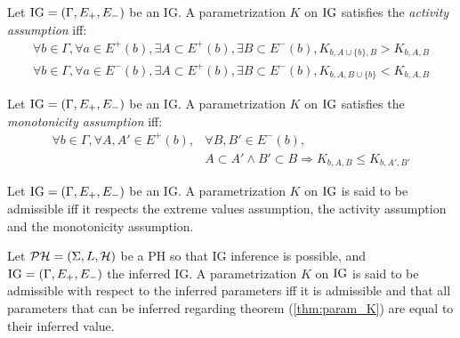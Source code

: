 \begin{property}
\label{prop:param_enum_activity}
Let $\mathrm{IG} = (\Gamma, E_+, E_-)$ be an IG. A parametrization $K$ on $\mathrm{IG}$ satisfies the \emph{activity assumption} iff:
\begin{align*}
  \forall b \in \Gamma, \forall a \in E^+(b), \exists A \subset E^+(b), \exists B \subset E^-(b),
    K_{b,A \cup \{b\},B} > K_{b,A,B}
\\
  \forall b \in \Gamma, \forall a \in E^-(b), \exists A \subset E^+(b), \exists B \subset E^-(b),
    K_{b,A,B \cup \{b\}} < K_{b,A,B}
\end{align*}
\end{property}

\begin{property}
\label{prop:param_enum_monotonicity}
Let $\mathrm{IG} = (\Gamma, E_+, E_-)$ be an IG. A parametrization $K$ on $\mathrm{IG}$ satisfies the \emph{monotonicity assumption} iff:
\begin{align*}
  \forall b \in \Gamma, \forall A, A' \in E^+(b), &\forall B, B' \in E^-(b),
\\
  &A \subset A' \wedge B' \subset B \Rightarrow K_{b,A,B} \leq K_{b,A',B'}
\end{align*}
\end{property}

\begin{definition}
\label{def:param_enum}
Let $\mathrm{IG} = (\Gamma, E_+, E_-)$ be an IG. A parametrization $K$ on $\mathrm{IG}$ is said to be admissible iff it respects the extreme values assumption, the activity assumption and the monotonicity assumption.
\end{definition}

\begin{definition}
\label{def:param_enum_inf}
Let $\mathcal{PH} = (\Sigma, L, \mathcal{H})$ be a PH so that IG inference is possible, and $\mathrm{IG} = (\Gamma, E_+,
E_-)$ the inferred IG. A parametrization $K$ on $\mathrm{IG}$ is said to be admissible with respect to the
inferred parameters iff it is admissible and that all parameters that can be inferred regarding
theorem (\ref{thm:param_K}) are equal to their inferred value.
\end{definition}

\newcommand{\ti}[1]{\texttt{\textit{#1}}}
\newcommand{\aspil}[1]{\texttt{#1}}
\newcommand{\asp}[1]{\begin{itemize} \item[] \aspil{#1} \end{itemize}}

